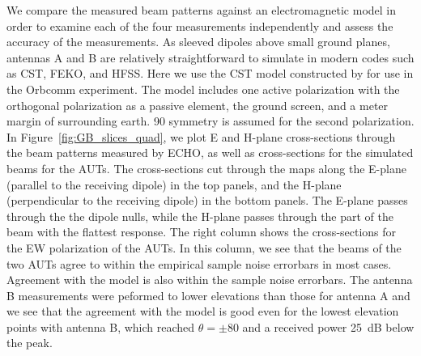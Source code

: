 \documentclass[preprint2,numberedappendix,tighten,twocolappendix]{aastex6}
\begin{document}
We compare the measured beam patterns against an electromagnetic model in order to examine each of the four measurements independently and assess the accuracy of the measurements.  As sleeved dipoles above small ground planes, antennas A and B are relatively straightforward to simulate in modern codes such as CST, FEKO, and HFSS. Here we use the CST model constructed by \citet{2015RaSc...50..614N} for use in the Orbcomm experiment.  The model includes one active polarization with the orthogonal polarization as a passive element, the ground screen, and a meter margin of surrounding earth. 90\arcdeg{} symmetry is assumed for the second polarization.   In Figure~\ref{fig:GB_slices_quad}, we plot E and H-plane cross-sections through the beam patterns measured by ECHO, as well as cross-sections for the simulated beams for the AUTs.   The cross-sections cut through the maps along the E-plane (parallel to the receiving dipole) in the top panels, and the H-plane (perpendicular to the receiving dipole) in the bottom panels.  The E-plane passes through the the dipole nulls, while the H-plane passes through the part of the beam with the flattest response.   The right column shows the cross-sections for the EW polarization of the AUTs.  In this column, we see that the beams of the two AUTs agree to within the empirical sample noise errorbars in most cases.  Agreement with the model is also within the sample noise errorbars.  The antenna B measurements were peformed to lower elevations than those for antenna A and we see that the agreement with the model is good even for the lowest elevation points with antenna B, which reached $\theta=\pm80$\arcdeg{} and a received power 25~dB below the peak.    
\end{document}
